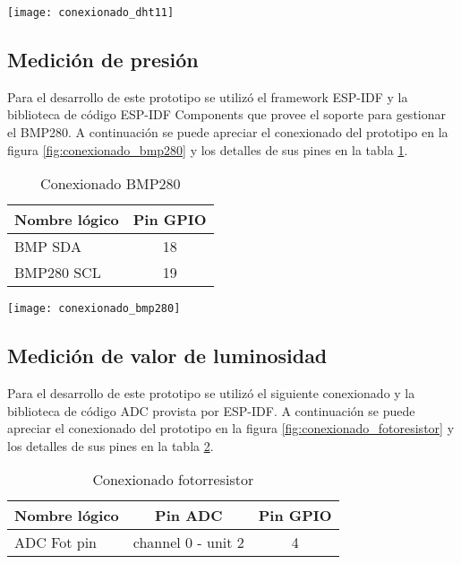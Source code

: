 \vspace{0.5cm}   
\begin{center}
  \texttt{[image: conexionado\_dht11]}
    \label{fig:conexionado_dht11}
\end{center}




\subsection{Medición de presión}
Para el desarrollo de este prototipo se utilizó el framework ESP-IDF y la biblioteca de código ESP-IDF Components que provee el soporte para gestionar el BMP280. A continuación se puede apreciar el conexionado del prototipo en la figura \ref{fig:conexionado_bmp280} y los detalles de sus pines en la tabla \ref{tab:conexionado_bmp280}.

\vspace{0.5cm}    
\begin{table}[h]
\centering
\caption[Conexionado BMP280]{Conexionado BMP280}
\begin{tabular}{l c }
\toprule
\textbf{Nombre lógico} &  \textbf{Pin GPIO}\\
\midrule
 BMP SDA & 18 \\
 BMP280 SCL & 19  \\
\bottomrule
\hline
\end{tabular}
\label{tab:conexionado_bmp280} 
\end{table}
    
\vspace{0.5cm}    
\begin{center}
  \texttt{[image: conexionado\_bmp280]}
    \label{fig:conexionado_bmp280}
\end{center}




\subsection{Medición de valor de luminosidad}
Para el desarrollo de este prototipo se utilizó el siguiente conexionado y la biblioteca de código ADC provista por ESP-IDF. A continuación se puede apreciar el conexionado del prototipo en la figura \ref{fig:conexionado_fotoresistor} y los detalles de sus pines en la tabla \ref{tab:conexionado_fotoresistor}.

\vspace{0.5cm}    
\begin{table}[h]
\centering
\caption[Conexionado fotorresistor]{Conexionado fotorresistor}
\begin{tabular}{l c c}
\toprule
\textbf{Nombre lógico} & \textbf{Pin ADC} & \textbf{Pin GPIO}\\
\midrule
ADC Fot pin & channel 0 - unit 2 & 4\\
\bottomrule
\hline
\end{tabular}
\label{tab:conexionado_fotoresistor}
\end{table}


